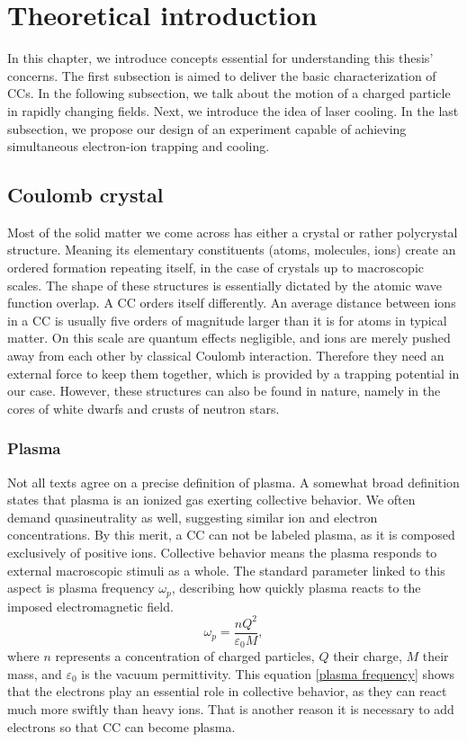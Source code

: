 \chapter{Theoretical introduction}
\label{chap:intro}

In this chapter, we introduce concepts essential for understanding this thesis' concerns. The first subsection is aimed to deliver the basic characterization of CCs. In the following subsection, we talk about the motion of a charged particle in rapidly changing fields. Next, we introduce the idea of laser cooling. In the last subsection, we propose our design of an experiment capable of achieving simultaneous electron-ion trapping and cooling.

\section{Coulomb crystal}
Most of the solid matter we come across has either a crystal or rather polycrystal structure. Meaning its elementary constituents (atoms, molecules, ions) create an ordered formation repeating itself, in the case of crystals up to macroscopic scales. The shape of these structures \cite{drewsen2003ion} is essentially dictated by the atomic wave function overlap. A CC orders itself differently. An average distance between ions in a CC is usually \cite{thompson2015ion} five orders of magnitude larger than it is for atoms in typical matter. On this scale are quantum effects negligible, and ions are merely pushed away from each other by classical Coulomb interaction. Therefore they need an external force to keep them together, which is provided by a trapping potential in our case. However, these structures can also be found in nature, namely in the cores of white dwarfs and crusts of neutron stars.

\subsection{Plasma}
Not all texts agree on a precise definition of plasma. A somewhat broad definition \cite{fitzpatrick2014plasma} states that plasma is an ionized gas exerting collective behavior. We often demand quasineutrality as well, suggesting similar ion and electron concentrations. By this merit, a CC can not be labeled plasma, as it is composed exclusively of positive ions. Collective behavior means the plasma responds to external macroscopic stimuli as a whole. The standard parameter linked to this aspect is plasma frequency $\omega_p$, describing how quickly plasma reacts to the imposed electromagnetic field.
\begin{equation}
	\label{plasma frequency}
	\omega_p = \frac{n Q^2}{\varepsilon_0 M},
\end{equation}
where $n$ represents a concentration of charged particles, $Q$ their charge, $M$ their mass, and $\varepsilon_0$ is the vacuum permittivity. This equation \eqref{plasma frequency} shows that the electrons play an essential role in collective behavior, as they can react much more swiftly than heavy ions. That is another reason it is necessary to add electrons so that CC can become plasma.


